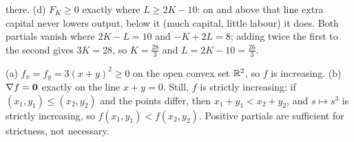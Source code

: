 \begin{solutions}
        there. (d) $F_{K}\ge0$ exactly where $L\ge2K-10$: on and above
        that line extra capital never lowers output, below it (much
        capital, little labour) it does. Both partials vanish where
        $2K-L=10$ and $-K+2L=8$; adding twice the first to the second gives
        $3K=28$, so $K=\tfrac{28}{3}$ and $L=2K-10=\tfrac{26}{3}$.
  \item (a) $f_{x}=f_{y}=3(x+y)^{2}\ge0$ on the open convex set $\mathbb{R}^{2}$,
        so $f$ is increasing. (b) $\nabla f=\mathbf{0}$ exactly on the line
        $x+y=0$. Still, $f$ is strictly increasing: if
        $(x_{1},y_{1})\le(x_{2},y_{2})$ and the points differ, then
        $x_{1}+y_{1}<x_{2}+y_{2}$, and $s\mapsto s^{3}$ is strictly
        increasing, so $f(x_{1},y_{1})<f(x_{2},y_{2})$. Positive partials
        are sufficient for strictness, not necessary.
\end{solutions}
